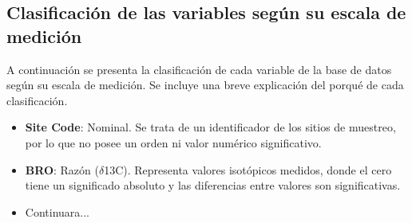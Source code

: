 \documentclass[a4paper,11pt]{article}
\begin{document}
\subsection*{Clasificación de las variables según su escala de medición}

A continuación se presenta la clasificación de cada variable de la base de datos según su escala de medición. Se incluye una breve explicación del porqué de cada clasificación.

\begin{itemize}
    \item \textbf{Site Code}: Nominal.
    Se trata de un identificador de los sitios de muestreo, por lo que no posee un orden ni valor numérico significativo.

    \item \textbf{BRO}: Razón ($\delta$13C).
    Representa valores isotópicos medidos, donde el cero tiene un significado absoluto y las diferencias entre valores son significativas.

    \item Continuara...

\end{itemize}
\end{document}
